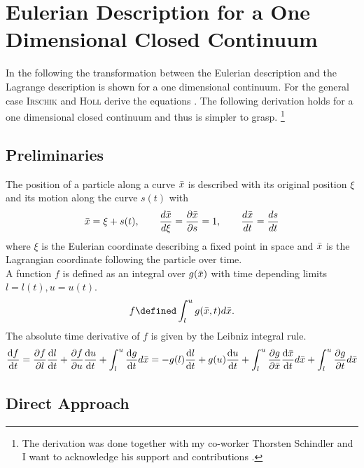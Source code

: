 \chapter{Eulerian Description for a One Dimensional Closed Continuum} \label{chap:CoordinateTransformationForTheOneDimConti}

In the following the transformation between the Eulerian description and the Lagrange description is shown for a one dimensional continuum.
For the general case \textsc{Irschik} and \textsc{Holl} derive the equations \cite{irschik_equations_2002}.
The following derivation holds for a one dimensional closed continuum and thus is simpler to grasp.
\footnote{The derivation was done together with my co-worker Thorsten Schindler and I want to acknowledge his support and contributions \cite{grundl_ale_2015}.}

\section{Preliminaries}

The position of a particle along a curve $\bar{x}$ is described with its original position $\xi$ and its motion along the curve $s(t)$ with
%
\begin{align}
  \bar{x} = \xi + s(t), \qquad \frac{d \bar{x}}{d \xi} = \frac{\partial \bar{x}}{\partial s} = 1, \qquad \frac{d \bar{x}}{dt} = \frac{d s}{dt} 
\end{align}
%
where $\xi$ is the Eulerian coordinate describing a fixed point in space and $\bar{x}$ is the Lagrangian coordinate following the particle over time.\\
%
A function $f$ is defined as an integral over $g(\bar{x})$ with time depending limits $l = l(t), u = u(t)$.
%
\begin{align*}
  f \defined \int _{l} ^{u} g(\barx, t) d\barx.
\end{align*}
%
The absolute time derivative of $f$ is given by the Leibniz integral rule. %
%
\begin{align}
  \frac{\mathrm{d} f}{\mathrm{d} t} = \frac{\partial {f}}{\partial {l}}  \frac{\mathrm{d} l}{\mathrm{d} t} + \frac{\partial {f}}{\partial {u}} \frac{\mathrm{d} u}{\mathrm{d} t} + \int _{l} ^{u}  \frac{\mathrm{d} g}{\mathrm{d} t} d \bar{x} = -g(l) \frac{\mathrm{d} l}{\mathrm{d} t} + g(u) \frac{\mathrm{d} u}{\mathrm{d} t} +  \int _{l} ^{u} \frac{\partial {g}}{\partial {\bar{x}}} \frac{\mathrm{d} \bar{x}}{\mathrm{d} t} d \bar{x} + \int _{l} ^{u} \frac{\partial {g}}{\partial {t}} d \bar{x}
\end{align}

\section{Direct Approach}

